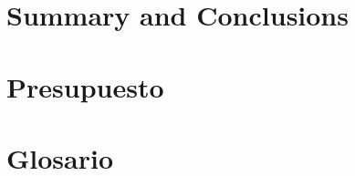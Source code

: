\documentclass[spanish,a4paper,twoside]{report}
\begin{document}
\chapter{Summary and Conclusions} 
\label{chapter:summary}



\newpage{\pagestyle{empty}\cleardoublepage}
\thispagestyle{empty}

\chapter{Presupuesto}
\label{chapter:presupuesto}





%

%


\newpage{\pagestyle{empty}\cleardoublepage}
\thispagestyle{empty}

\chapter{Glosario}
\label{chapter:glossary}








\end{document}
